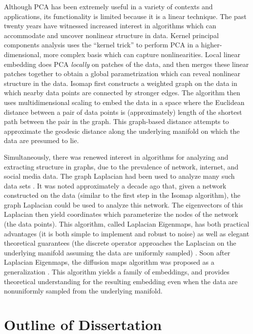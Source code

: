 Although PCA has been extremely useful in a variety of contexts and applications, its functionality is limited because it is a linear technique.
%
The past twenty years have witnessed increased interest in algorithms which can accommodate and uncover nonlinear structure in data.
%
Kernel principal components analysis \cite{scholkopf1997kernel} uses the ``kernel trick'' to perform PCA in a higher-dimensional, more complex basis which can capture nonlinearities.
%
Local linear embedding \cite{roweis2000nonlinear} does PCA {\em locally} on patches of the data, and then merges these linear patches together to obtain a global parametrization which can reveal nonlinear structure in the data.
%
Isomap \cite{tenenbaum2000global} first constructs a weighted graph on the data in which nearby data points are connected by stronger edges.
%
The algorithm then uses multidimensional scaling \cite{joseph1978multidimensional} to embed the data in a space where the Euclidean distance between a pair of data points is (approximately) length of the shortest path between the pair in the graph.
%
This graph-based distance attempts to approximate the geodesic distance along the underlying manifold on which the data are presumed to lie.

Simultaneously, there was renewed interest in algorithms for analyzing and extracting structure in graphs, due to the prevalence of network, internet, and social media data.
%
The graph Laplacian had been used to analyze many such data sets \cite{shi2000normalized, ng2002spectral}.
%
It was noted approximately a decade ago that, given a network constructed on the data (similar to the first step in the Isomap algorithm), the graph Laplacian could be used to analyze this network.
%
The eigenvectors of this Laplacian then yield coordinates which parameterize the nodes of the network (the data points).
%
This algorithm, called Laplacian Eigenmaps, has both practical advantages (it is both simple to implement and robust to noise) as well as elegant theoretical guarantees (the discrete operator approaches the Laplacian on the underlying manifold assuming the data are uniformly sampled) \cite{Belkin2003}.
%
Soon after Laplacian Eigenmaps, the diffusion maps algorithm was proposed as a generalization \cite{coifman2005geometric, coifman2006geometric}.
%
This algorithm yields a family of embeddings, and provides theoretical understanding for the resulting embedding even when the data are nonuniformly sampled from the underlying manifold.


\section{Outline of Dissertation}

